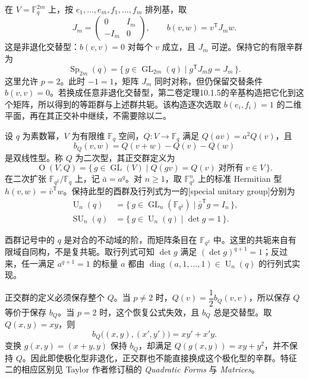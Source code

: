 \ProseParagraphBreak

在 \(V=\mathbb F_q^{2m}\) 上，按 \(e_1,\ldots,e_m,f_1,\ldots,f_m\) 排列基，取
\[
	J_m=\begin{pmatrix}0&I_m\\-I_m&0\end{pmatrix},\qquad
	b(v,w)=v^{\mathsf T}J_mw.
\]
这是非退化交替型：\(b(v,v)=0\) 对每个 \(v\) 成立，且 \(J_m\) 可逆。保持它的有限辛群为
\[
	\operatorname{Sp}_{2m}(q)=\{\,g\in\operatorname{GL}_{2m}(q)\mid g^{\mathsf T}J_mg=J_m\,\}.
\]
这里允许 \(p=2\)。此时 \(-1=1\)，矩阵 \(J_m\) 同时对称，但仍保留交替条件 \(b(v,v)=0\)。若换成任意非退化交替型，第二卷定理10.1.5的辛基构造把它化到这个矩阵，所以得到的等距群与上述群共轭。该构造逐次选取 \(b(e_i,f_i)=1\) 的二维平面，再在其正交补中继续，不需要除以二。

\begin{definition}\label{b5:def:F-finite-orthogonal-unitary}
	设 \(q\) 为素数幂，\(V\) 为有限维 \(\mathbb F_q\) 空间，\(Q:V\to\mathbb F_q\) 满足 \(Q(av)=a^2Q(v)\)，且
	\[
		b_Q(v,w)=Q(v+w)-Q(v)-Q(w)
	\]
	是双线性型。称 \(Q\) 为二次型，其正交群定义为
	\[
		\operatorname O(V,Q)=\{\,g\in\operatorname{GL}(V)\mid Q(gv)=Q(v)\;\text{对所有}\;v\in V\,\}.
	\]
	在二次扩张 \(\mathbb F_{q^2}/\mathbb F_q\) 上，记 \(\bar a=a^q\)。对 \(n\ge1\)，取 \(\mathbb F_{q^2}^n\) 上的标准 Hermitian 型 \(h(v,w)=\bar v^{\mathsf T}w\)。保持此型的酉群及行列式为一的[special unitary group]分别为
	\[
		\begin{aligned}
			\operatorname U_n(q)&=\{\,g\in\operatorname{GL}_n(\mathbb F_{q^2})\mid\bar g^{\mathsf T}g=I_n\,\},\\
			\operatorname{SU}_n(q)&=\{\,g\in\operatorname U_n(q)\mid\det g=1\,\}.
		\end{aligned}
	\]
\end{definition}
酉群记号中的 \(q\) 是对合的不动域的阶，而矩阵条目在 \(\mathbb F_{q^2}\) 中。这里的共轭来自有限域自同构，不是复共轭。取行列式可知 \(\det g\) 满足 \((\det g)^{q+1}=1\)；反过来，任一满足 \(a^{q+1}=1\) 的标量 \(a\) 都由 \(\operatorname{diag}(a,1,\ldots,1)\in\operatorname U_n(q)\) 的行列式实现。

\ProseParagraphBreak

正交群的定义必须保存整个 \(Q\)。当 \(p\ne2\) 时，\(Q(v)=\dfrac{1}{2}b_Q(v,v)\)，所以保存 \(Q\) 等价于保存 \(b_Q\)。当 \(p=2\) 时，这个恢复公式失效，且 \(b_Q\) 总是交替型。取 \(Q(x,y)=xy\)，则
\[
	b_Q\bigl((x,y),(x',y')\bigr)=xy'+x'y.
\]
变换 \(g(x,y)=(x+y,y)\) 保持 \(b_Q\)，却满足 \(Q(g(x,y))=xy+y^2\)，并不保持 \(Q\)。因此即使极化型非退化，正交群也不能直接换成这个极化型的辛群。特征二的相应区别见 Taylor 作者修订稿的 \emph{Quadratic Forms} 与 \emph{Matrices}\cite[Chapter 7, pp.~54--55; Chapter 11, pp.~136--137]{Taylor1992ClassicalGroups}。

